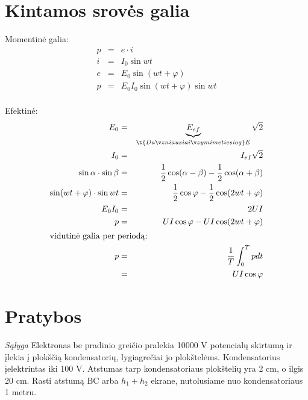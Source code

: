 \section{Kintamos srovės galia}

Momentinė galia:
\begin{align*}
  p &=& e \cdot i \\
  i &=& I_{0} \sin wt \\
  e &=& E_{0} \sin \left( wt + \varphi \right) \\
  p &=& E_{0} I_{0} \sin \left( wt + \varphi \right) \sin wt \\
\end{align*}

Efektinė:
\begin{align*}
  E_{0}
  &=& \underbrace{E_{ef}}_{\t{Dažniausiai žymime tiesiog} E} \sqrt{2} \\
  I_{0} &=& I_{ef} \sqrt{2} \\
  \sin \alpha \cdot \sin \beta
  &=& \frac{1}{2} \cos(\alpha - \beta) - \frac{1}{2} \cos(\alpha + \beta) \\
  \sin (wt + \varphi) \cdot \sin wt
  &=& \frac{1}{2} \cos \varphi - \frac{1}{2} \cos (2 wt + \varphi) \\
  E_{0}I_{0} &=&  2 UI \\
  p &=& UI \cos \varphi - UI\cos (2wt + \varphi) \\
  \intertext{vidutinė galia per periodą:}
  p
  &=& \frac{1}{T} \int _{0} ^{T} p dt \\
  &=& UI \cos \varphi \\
\end{align*}

\section{Pratybos}


\emph{Sąlyga} Elektronas be pradinio greičio pralekia 10000 V potencialų
skirtumą ir įlekia į plokščią kondensatorių, lygiagrečiai jo plokštelėms.
Kondensatorius įelektrintas iki 100 V. Atstumas tarp kondensatoriaus
plokštelių yra 2 cm, o ilgis 20 cm. Rasti atstumą BC arba $h_{1} + h_{2}$
ekrane, nutolusiame nuo kondensatoriaus 1 metru.

